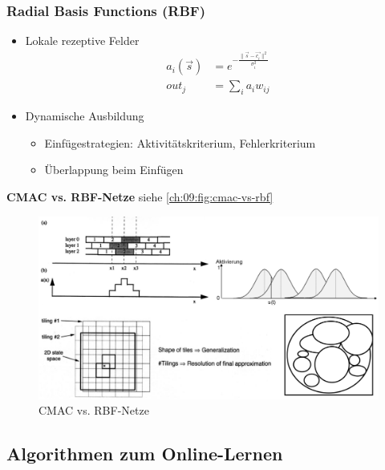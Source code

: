 \subsubsection{Radial Basis Functions (RBF)}
\begin{itemize}
	\item Lokale rezeptive Felder
	\begin{align}
		a_i(\overset{\rightarrow}{s}) &= e^{- \frac{\parallel \overset{\rightarrow}{s} -  \overset{\rightarrow} {c_i}\parallel^2}{\sigma_i^2}} \\
		out_j &= \sum_i a_i w_{ij}
	\end{align}
	\item Dynamische Ausbildung
	\begin{itemize}
		\item Einfügestrategien: Aktivitätskriterium, Fehlerkriterium
		\item Überlappung beim Einfügen
	\end{itemize}
\end{itemize}
\textbf{CMAC vs. RBF-Netze} siehe \autoref{ch:09:fig:cmac-vs-rbf}\\
\begin{figure}
	\centering
	\includegraphics[width=\textwidth]{figures/rbf_vs_cmac.png}
	\caption{CMAC vs. RBF-Netze}
	\label{ch:09:fig:cmac-vs-rbf}
\end{figure}

\subsection{Algorithmen zum Online-Lernen}

